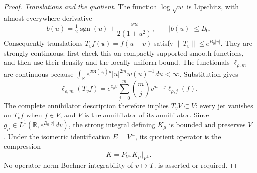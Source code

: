\documentclass[11pt,a4paper]{article}
\newcommand{\R}{\mathbb R}
\begin{document}
\begin{proof}
\emph{Translations and the quotient.}
The function $\log\sqrt w$ is Lipschitz, with almost-everywhere derivative
\[
 b(u)=\tfrac12\operatorname{sgn}(u)+\frac{s u}{2(1+u^2)},
 \qquad |b(u)|\le B_0.
\]
Consequently translations $T_vf(u)=f(u-v)$ satisfy
$\|T_v\|\le e^{B_0|v|}$. They are strongly continuous: first check this on compactly supported smooth functions, and then use their density and the locally uniform bound. The functionals $\ell_{\rho,m}$ are continuous because
$\int_{\R}e^{2\Re(z_\rho)u}|u|^{2m}w(u)^{-1}\,du<\infty$. Substitution gives
\begin{equation}\label{eq:masjettranslation}
 \ell_{\rho,m}(T_vf)=e^{z_\rho v}
 \sum_{j=0}^m\binom{m}{j}v^{m-j}\ell_{\rho,j}(f).
\end{equation}
The complete annihilator description therefore implies $T_vV\subset V$: every jet vanishes on $T_vf$ when $f\in V$, and $V$ is the annihilator of its annihilator. Since
$g_\mu\in L^1(\R,e^{B_0|v|}\,dv)$, the strong integral defining $K_\mu$ is bounded and preserves $V$. Under the isometric identification $E=V^\perp$, its quotient operator is the compression
\[
 K=P_{V^\perp}K_\mu|_{V^\perp}.
\]
No operator-norm Bochner integrability of $v\mapsto T_v$ is asserted or required.


\end{proof}
\end{document}
